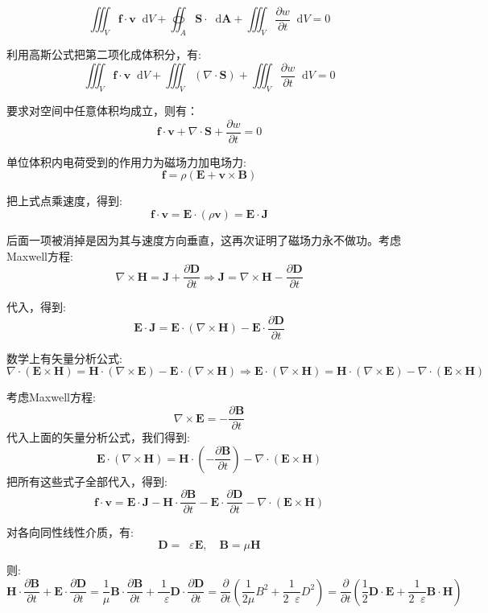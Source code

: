 \documentclass[12pt,a4paper,oneside]{report}
\theoremstyle{definition}
\theoremstyle{remark}
\newcommand{\mb}[1]{\mathbf{#1}}
\renewcommand{\d}{\mathop{}\!\mathrm{d}}
\renewcommand{\v}{\mathop{}\!\varepsilon}
\begin{document}
\[
\iiint_V \mb{f}\cdot \mb{v} \d V + \oiint_A \mb{S} \cdot \d \mb{A}+\iiint_V  \frac{\partial w}{\partial t}\d V = 0
\]

利用高斯公式把第二项化成体积分，有:
\[
\iiint_V \mb{f}\cdot \mb{v} \d V + \iiint_V (\nabla \cdot \mb{S}) +\iiint_V  \frac{\partial w}{\partial t}\d V = 0
\]

要求对空间中任意体积均成立，则有：
\[
 \mb{f}\cdot \mb{v}  +  \nabla \cdot \mb{S} + \frac{\partial w}{\partial t} = 0
\]

单位体积内电荷受到的作用力为磁场力加电场力:
\[
\mb{f} = \rho(\mb{E}+\mb{v}\times\mb{B})
\]

把上式点乘速度，得到:
\[
\mb{f}\cdot \mb{v} = \mb{E} \cdot (\rho \mb{v}) = \mb{E} \cdot \mb{J}
\]

后面一项被消掉是因为其与速度方向垂直，这再次证明了磁场力永不做功。考虑Maxwell方程:
\[
\nabla\times\mathbf{H} = \mathbf{J} + \frac{\partial\mathbf{D}}{\partial t} \Rightarrow \mathbf{J} = \nabla\times\mathbf{H} - \frac{\partial\mathbf{D}}{\partial t} 
\]

代入，得到:
\[
\mb{E} \cdot \mb{J} = \mb{E} \cdot (\nabla\times\mathbf{H}) -  \mb{E} \cdot\frac{\partial\mathbf{D}}{\partial t}
\]

数学上有矢量分析公式:
\[
\nabla \cdot(\mb{E} \times \mb{H}) = \mb{H}\cdot(\nabla \times \mb{E}) - \mb{E}\cdot (\nabla \times \mb{H}) \Rightarrow \mb{E}\cdot (\nabla \times \mb{H})  = \mb{H}\cdot(\nabla \times \mb{E}) - \nabla \cdot(\mb{E} \times \mb{H})
\]

考虑Maxwell方程:
\[
\nabla\times\mathbf{E} = -\frac{\partial\mathbf{B}}{\partial t}
\]
代入上面的矢量分析公式，我们得到:
\[
\mb{E}\cdot (\nabla \times \mb{H}) = \mb{H}\cdot (-\frac{\partial\mathbf{B}}{\partial t})- \nabla \cdot(\mb{E} \times \mb{H})
\]
把所有这些式子全部代入，得到:
\[
\mb{f}\cdot \mb{v} = \mb{E} \cdot \mb{J} -\mb{H}\cdot \frac{\partial\mathbf{B}}{\partial t}- \mb{E} \cdot\frac{\partial\mathbf{D}}{\partial t}  - \nabla \cdot(\mb{E} \times \mb{H})
\]

对各向同性线性介质，有:
\[
\mb{D} = \v \mb{E}, \quad \mb{B} = \mu \mb{H}
\]

则:
\[
\mb{H}\cdot \frac{\partial\mathbf{B}}{\partial t} + \mb{E} \cdot\frac{\partial\mathbf{D}}{\partial t} = \frac{1}{\mu}\mb{B}\cdot \frac{\partial\mathbf{B}}{\partial t} +  \frac{1}{\v}\mb{D} \cdot\frac{\partial\mathbf{D}}{\partial t} = \frac{\partial}{\partial t}(\frac{1}{2\mu}B^2+\frac{1}{2\v}D^2) = \frac{\partial}{\partial t}(\frac{1}{2}\mb{D}\cdot\mb{E}+\frac{1}{2\v}\mb{B}\cdot\mb{H})
\]
\end{document}
